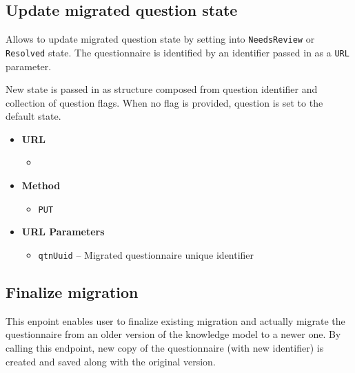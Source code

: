 \subsection{Update migrated question state}

Allows to update migrated question state by setting into \texttt{NeedsReview} or \texttt{Resolved} state.
The questionnaire is identified by an identifier passed in as a \texttt{URL} parameter.

New state is passed in as structure composed from question identifier and collection of question flags.
When no flag is provided, question is set to the default state.

\begin{itemize}
    \item \textbf{URL}
        \begin{itemize}
            \item {}
        \end{itemize}

    \item \textbf{Method}
        \begin{itemize}
            \item \texttt{PUT}
        \end{itemize}

    \item \textbf{URL Parameters}
        \begin{itemize}
            \item \texttt{qtnUuid} -- Migrated questionnaire unique identifier
        \end{itemize}
\end{itemize}

\subsection{Finalize migration}

This enpoint enables user to finalize existing migration and actually migrate the questionnaire from an older version of the knowledge model to a newer one.
By calling this endpoint, new copy of the questionnaire (with new identifier) is created and saved along with the original version.

